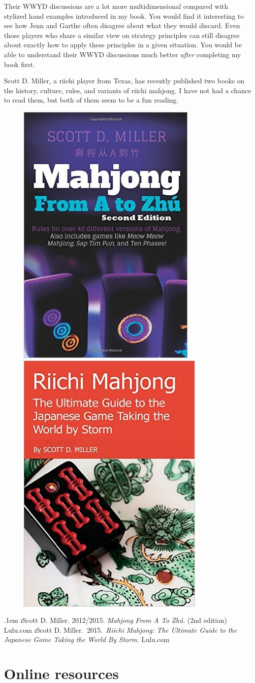 \bigskip
Their WWYD discussions are a lot more multidimensional compared with stylized hand examples introduced in my book. You would find it interesting to see how Jenn and Garthe often disagree about what they would discard. Even those players who share a similar view on strategy principles can still disagree about exactly how to apply these principles in a given situation.
You would be able to understand their WWYD discussions much better \emph{after} completing my book first.

\bigskip
Scott D. Miller, a riichi player from Texas, has recently published two books on the history, culture, rules, and variants of riichi mahjong. I have not had a chance to read them, but both of them seem to be a fun reading.

\vspace{-2pt}
\begin{figure}[h]\centering
\includegraphics[height=.34\textwidth,clip]{figs/miller1}
\includegraphics[height=.34\textwidth,clip]{figs/miller2}
\end{figure}
\vspace{-15pt}
\be\itemsep.1em \setcounter{enumi}{5}
\i Scott D. Miller. 2012/2015. \textit{Mahjong From A To Zh\'{u}.} (2nd edition) Lulu.com
\i Scott D. Miller.~2015.~\textit{Riichi Mahjong: The Ultimate Guide to the Japanese Game Taking the World By Storm.} Lulu.com
\ee


\newpage
\section{Online resources}

